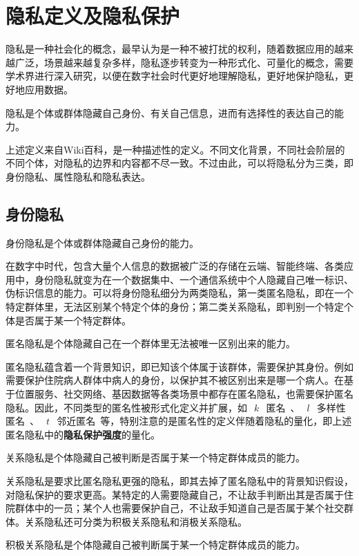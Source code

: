 \section{隐私定义及隐私保护}
隐私是一种社会化的概念，最早认为是一种不被打扰的权利，随着数据应用的越来越广泛，场景越来越复杂多样，隐私逐步转变为一种形式化、可量化的概念，需要学术界进行深入研究，以便在数字社会时代更好地理解隐私，更好地保护隐私，更好地应用数据。

\begin{definition}
	隐私是个体或群体隐藏自己身份、有关自己信息，进而有选择性的表达自己的能力。
\end{definition}

上述定义来自Wiki百科，是一种描述性的定义。不同文化背景，不同社会阶层的不同个体，对隐私的边界和内容都不尽一致。不过由此，可以将隐私分为三类，即身份隐私、属性隐私和隐私表达。

\subsection{身份隐私}
\begin{definition}
身份隐私是个体或群体隐藏自己身份的能力。
\end{definition}

在数字中时代，包含大量个人信息的数据被广泛的存储在云端、智能终端、各类应用中，身份隐私就变为在一个数据集中、一个通信系统中个人隐藏自己唯一标识、伪标识信息的能力。可以将身份隐私细分为两类隐私，第一类匿名隐私，即在一个特定群体里，无法区别某个特定个体的身份；第二类关系隐私，即判别一个特定个体是否属于某一个特定群体。
\begin{definition}
	匿名隐私是个体隐藏自己在一个群体里无法被唯一区别出来的能力。
\end{definition}

匿名隐私蕴含着一个背景知识，即已知该个体属于该群体，需要保护其身份。例如需要保护住院病人群体中病人的身份，以保护其不被区别出来是哪一个病人。在基于位置服务、社交网络、基因数据等各类场景中都存在匿名隐私，也需要保护匿名隐私。因此，不同类型的匿名性被形式化定义并扩展，如~$~k~$~匿名~\cite{sweeney2002k}、~$~l~$~多样性匿名~\cite{machanavajjhala2007l}、~$~t~$~邻近匿名~\cite{li2007t}等，特别注意的是匿名性的定义伴随着隐私的量化，即上述匿名隐私中的\textbf{隐私保护强度}的量化。

\begin{definition}
	关系隐私是个体隐藏自己被判断是否属于某一个特定群体成员的能力。
\end{definition}

关系隐私是要求比匿名隐私更强的隐私，即其去掉了匿名隐私中的背景知识假设，对隐私保护的要求更高。某特定的人需要隐藏自己，不让敌手判断出其是否属于住院群体中的一员；某个人也需要保护自己，不让敌手知道自己是否属于某个社交群体。关系隐私还可分类为积极关系隐私和消极关系隐私。
\begin{definition}
	积极关系隐私是个体隐藏自己被判断属于某一个特定群体成员的能力。
\end{definition}

